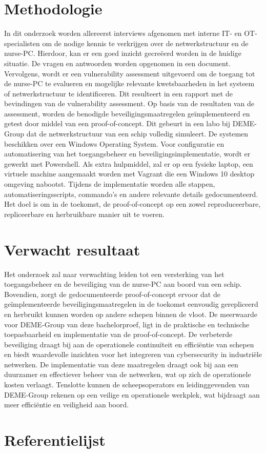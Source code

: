 \section{Methodologie}%
\label{sec:methodologie}
In dit onderzoek worden allereerst interviews afgenomen met interne IT- en OT-specialisten om de nodige kennis te verkrijgen over de netwerkstructuur en de nurse-PC.
Hierdoor, kan er een goed inzicht gecreëerd worden in de huidige situatie. De vragen en antwoorden worden opgenomen in een document.
Vervolgens, wordt er een vulnerability assessment uitgevoerd om de toegang tot de nurse-PC te evalueren en mogelijke relevante kwetsbaarheden in het systeem of netwerkstructuur te identificeren. 
Dit resulteert in een rapport met de bevindingen van de vulnerability assessment.
Op basis van de resultaten van de assessment, worden de benodigde beveiligingsmaatregelen geïmplementeerd en getest door middel van een proof-of-concept. Dit gebeurt in een labo bij DEME-Group dat de netwerkstructuur van een schip volledig simuleert.  
De systemen beschikken over een Windows Operating System. Voor configuratie en automatisering van het toegangsbeheer en beveiligingsimplementatie, wordt er gewerkt met Powershell. 
Als extra hulpmiddel, zal er op een fysieke laptop, een virtuele machine aangemaakt worden met Vagrant die een Windows 10 desktop omgeving nabootst.
Tijdens de implementatie worden alle stappen, automatiseringsscripts, commando's en andere relevante details gedocumenteerd. Het doel is om in de toekomst, de proof-of-concept op een zowel reproduceerbare, repliceerbare en herbruikbare manier uit te voeren.


\section{Verwacht resultaat}%
\label{sec:verwachte_resultaten}
Het onderzoek zal naar verwachting leiden tot een versterking van het toegangsbeheer en de beveiliging van de nurse-PC aan boord van een schip.
Bovendien, zorgt de gedocumenteerde proof-of-concept ervoor dat de geïmplementeerde beveiligingsmaatregelen in de toekomst eenvoudig gerepliceerd en herbruikt kunnen worden op andere schepen binnen de vloot.
De meerwaarde voor DEME-Group van deze bachelorproef, ligt in de praktische en technische toepasbaarheid en implementatie van de proof-of-concept. 
De verbeterde beveiliging draagt bij aan de operationele continuïteit en efficiëntie van schepen en biedt waardevolle inzichten voor het integreren van cybersecurity in industriële netwerken. 
De implementatie van deze maatregelen draagt ook bij aan een duurzamer en effectiever beheer van de netwerken, wat op zich de operationele kosten verlaagt.
Tenslotte kunnen de scheepsoperators en leidinggevenden van DEME-Group rekenen op een veilige en operationele werkplek, wat bijdraagt aan meer efficiëntie en veiligheid aan boord.


\section{Referentielijst}%
\label{sec:Referentielijst}

